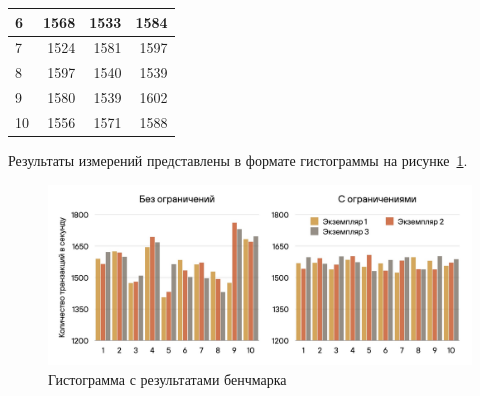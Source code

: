 \begin{table}[H]
\begin{center}
\begin{tabular}{|l|r|r|r|}
6                                       & 1568                                                                                      & 1533                                                                                      & 1584                                                                                      \\ \hline
7                                       & 1524                                                                                      & 1581                                                                                      & 1597                                                                                      \\ \hline
8                                       & 1597                                                                                      & 1540                                                                                      & 1539                                                                                      \\ \hline
9                                       & 1580                                                                                      & 1539                                                                                      & 1602                                                                                      \\ \hline
10                                      & 1556                                                                                      & 1571                                                                                      & 1588                                                                                      \\ \hline
\end{tabular}
\end{center}
\end{table}


Результаты измерений представлены в формате гистограммы на рисунке~\ref{img:plot}.

\begin{figure}[h!]
    \centering
    \includegraphics[width=\textwidth]{assets/plot.jpeg}
    \caption{Гистограмма с результатами бенчмарка}
    \label{img:plot}
\end{figure}

